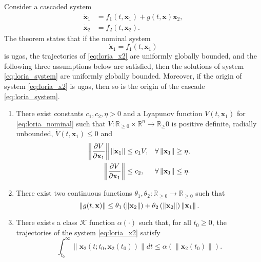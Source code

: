 Consider a cascaded system
\begin{subequations}\label{eq:loria_system}
\begin{align}
    \dot{\mathbf{x}}_1 &= f_1(t,\mathbf{x}_1) + g(t,\mathbf{x}) \mathbf{x}_2,\\
    \dot{\mathbf{x}}_2 &= f_2(t,\mathbf{x}_2). \label{eq:loria_x2}
\end{align}
\end{subequations}
The theorem \cite[Theorem 2.1]{lamnabhi-lagarrigue_2_2005} states that if the nominal system
\begin{equation}\label{eq:loria_nominal}
    \dot{\mathbf{x}}_1 = f_1(t,\mathbf{x}_1)
\end{equation}
is \gls{ugas}, the trajectories of \eqref{eq:loria_x2} are uniformly globally bounded, and the following three assumptions below are satisfied, then the solutions of system \eqref{eq:loria_system} are uniformly globally bounded. Moreover, if the origin of system \eqref{eq:loria_x2} is \gls{ugas}, then so is the origin of the cascade \eqref{eq:loria_system}.

\begin{enumerate}
    \item There exist constants $c_1, c_2, \eta > 0$ and a  Lyapunov function $V(t,\mathbf{x}_1)$ for \eqref{eq:loria_nominal} such that $V \colon \mathbb R_{\geq0}\times \mathbb{R}^n \rightarrow \mathbb R_\geq0$ is positive definite, radially unbounded, $\dot{V}(t,\mathbf{x}_1) \leq 0$ and
    \begin{subequations}
        \begin{align}
            \left\|\frac{\partial V}{\partial \mathbf{x}_1}\right\| \left\|\mathbf{x}_1\right\| &\leq c_1 V,& \forall&\left\|\mathbf{x}_1\right\| \geq \eta, \\
            \left\|\frac{\partial V}{\partial \mathbf{x}_1}\right\| &\leq c_2,& \forall&\left\|\mathbf{x}_1\right\| \leq \eta.
        \end{align}
    \end{subequations}
    \item There exist two continuous functions $\theta_1, \theta_2: \mathbb{R}_{\geq 0} \rightarrow \mathbb{R}_{\geq 0}$ such that
    \begin{equation}
        \left\|g(t, \mathbf{x})\right\| \leq \theta_1 \left(\left\|\mathbf{x}_2\right\|\right) + \theta_2 \left(\left\|\mathbf{x}_2\right\|\right) \left\|\mathbf{x}_1\right\|.
    \end{equation}

    \item There exists a class $\mathcal{K}$ function $\alpha(\cdot)$ such that, for all $t_0\geq 0$, the trajectories of the system \eqref{eq:loria_x2} satisfy
    \begin{equation}
        \int_{t_0}^\infty \|\mathbf{x}_2(t;t_0,\mathbf{x}_2(t_0))\| dt \leq \alpha(\|\mathbf{x}_2(t_0)\|).
    \end{equation}
\end{enumerate}

